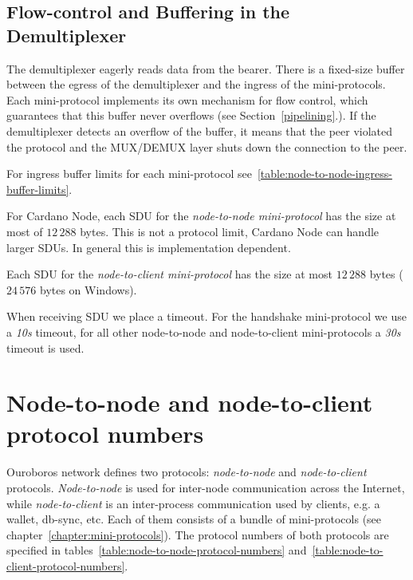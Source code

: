 \subsection{Flow-control and Buffering in the Demultiplexer}
\label{mux-flow-control}
The demultiplexer eagerly reads data from the bearer.
There is a fixed-size buffer between the egress of the demultiplexer and the ingress of
the mini-protocols.
Each mini-protocol implements its own mechanism for flow control, which guarantees that this buffer
never overflows (see Section~\ref{pipelining}.).
If the demultiplexer detects an overflow of the buffer, it means that the peer violated the
protocol and the MUX/DEMUX layer shuts down the connection to the peer.

For ingress buffer limits for each mini-protocol
see~\ref{table:node-to-node-ingress-buffer-limits}.

For Cardano Node, each SDU for the \textit{node-to-node mini-protocol} has the size at most of
$12\,288$ bytes.  This is not a protocol limit, Cardano Node can handle larger
SDUs.  In general this is implementation dependent.

Each SDU for the \textit{node-to-client mini-protocol} has the size at most
$12\,288$ bytes ($24\,576$ bytes on Windows).

When receiving SDU we place a timeout. For the handshake mini-protocol we use
a \textit{10s} timeout, for all other node-to-node and node-to-client mini-protocols
a \textit{30s} timeout is used.

\section{Node-to-node and node-to-client protocol numbers}
\noindent{}
\newline{}
\newline{}

Ouroboros network defines two protocols: \emph{node-to-node} and
\emph{node-to-client} protocols.  \emph{Node-to-node} is used for inter-node
communication across the Internet, while \emph{node-to-client} is an inter-process communication used by clients, e.g. a wallet, db-sync, etc.  Each of them consists of a bundle of mini-protocols (see chapter~\ref{chapter:mini-protocols}).
The protocol numbers of both protocols
are specified in tables~\ref{table:node-to-node-protocol-numbers}
and~\ref{table:node-to-client-protocol-numbers}.
